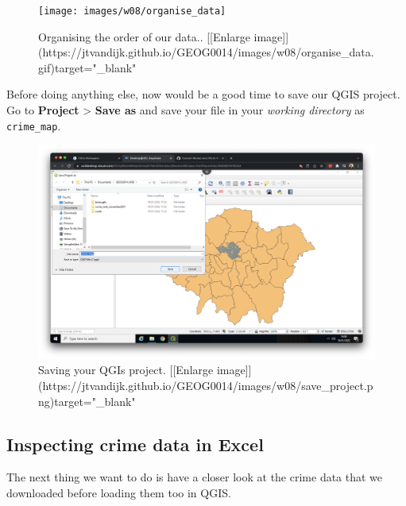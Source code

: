 \documentclass[
]{book}
\begin{document}
\begin{figure}

{\centering \texttt{[image: images/w08/organise\_data]} 

}

\caption{Organising the order of our data.. [[Enlarge image]](https://jtvandijk.github.io/GEOG0014/images/w08/organise_data.gif){target="_blank"}}\label{fig:organise-data}
\end{figure}

Before doing anything else, now would be a good time to save our QGIS project. Go to \textbf{Project} \textgreater{} \textbf{Save as} and save your file in your \emph{working directory} as \texttt{crime\_map}.

\begin{figure}

{\centering \includegraphics[width=850pt]{images/w08/save_project} 

}

\caption{Saving your QGIs project. [[Enlarge image]](https://jtvandijk.github.io/GEOG0014/images/w08/save_project.png){target="_blank"}}\label{fig:save-project}
\end{figure}

\hypertarget{inspecting-crime-data-in-excel}{%
\subsection*{Inspecting crime data in Excel}\label{inspecting-crime-data-in-excel}}

The next thing we want to do is have a closer look at the crime data that we downloaded before loading them too in QGIS.
\end{document}
